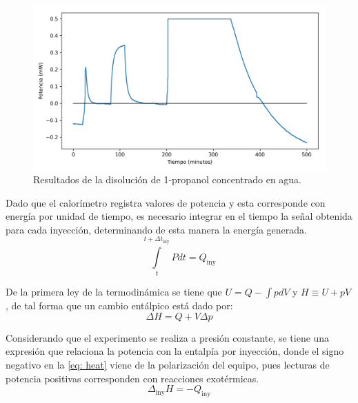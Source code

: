 		\begin{figure}[h]
			\centering
			\includegraphics[width=\linewidth]{../Data/ChemicalCalibrations/concentratedPropanol}
			\caption{Resultados de la disoluci\'on de 1-propanol concentrado en agua.}
			\label{fig: CPropanolResults}
		\end{figure}
		
		Dado que el calor\'imetro registra valores de potencia y esta corresponde con energ\'ia por unidad de tiempo, es necesario integrar en el tiempo la se\~nal obtenida para cada inyecci\'on, determinando de esta manera la energía generada.
		\begin{equation}\label{eq: heat}
			\int\limits_t^{t + \Delta t_\text{iny}} Pdt = Q_\text{iny}
		\end{equation}
		
		De la primera ley de la termodin\'amica se tiene que $U = Q - \int pdV$ y $H\equiv U+pV$, de tal forma que un cambio ent\'alpico est\'a dado por:
		\begin{equation}\label{eq: enthalpy}
			\Delta H = Q + V\Delta p
		\end{equation}
		
		Considerando que el experimento se realiza a presi\'on constante, se tiene una expresi\'on que relaciona la potencia con la entalp\'ia por inyecci\'on, donde el signo negativo en la \autoref{eq: heat} viene de la polarizaci\'on del equipo, pues lecturas de potencia positivas corresponden con reacciones exot\'ermicas.
		\begin{equation}
			\Delta_\text{iny} H = -Q_\text{iny}
		\end{equation}
		
